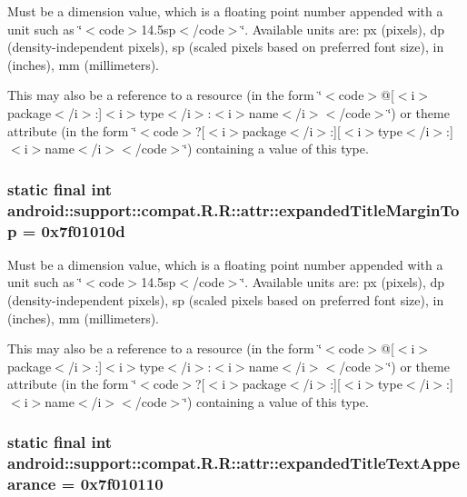 Must be a dimension value, which is a floating point number appended with a unit such as \char`\"{}$<$code$>$14.5sp$<$/code$>$\char`\"{}. Available units are: px (pixels), dp (density-independent pixels), sp (scaled pixels based on preferred font size), in (inches), mm (millimeters). 

This may also be a reference to a resource (in the form \char`\"{}$<$code$>$@\mbox{[}$<$i$>$package$<$/i$>$:\mbox{]}$<$i$>$type$<$/i$>$:$<$i$>$name$<$/i$>$$<$/code$>$\char`\"{}) or theme attribute (in the form \char`\"{}$<$code$>$?\mbox{[}$<$i$>$package$<$/i$>$:\mbox{]}\mbox{[}$<$i$>$type$<$/i$>$:\mbox{]}$<$i$>$name$<$/i$>$$<$/code$>$\char`\"{}) containing a value of this type. \hypertarget{classandroid_1_1support_1_1compat_1_1_r_1_1attr_1d98d1bed92ccab125168dd5e73a9acc}{
\subsubsection[{expandedTitleMarginTop}]{\setlength{\rightskip}{0pt plus 5cm}static final int android::support::compat.R.R::attr::expandedTitleMarginTop = 0x7f01010d}}
\label{classandroid_1_1support_1_1compat_1_1_r_1_1attr_1d98d1bed92ccab125168dd5e73a9acc}


Must be a dimension value, which is a floating point number appended with a unit such as \char`\"{}$<$code$>$14.5sp$<$/code$>$\char`\"{}. Available units are: px (pixels), dp (density-independent pixels), sp (scaled pixels based on preferred font size), in (inches), mm (millimeters). 

This may also be a reference to a resource (in the form \char`\"{}$<$code$>$@\mbox{[}$<$i$>$package$<$/i$>$:\mbox{]}$<$i$>$type$<$/i$>$:$<$i$>$name$<$/i$>$$<$/code$>$\char`\"{}) or theme attribute (in the form \char`\"{}$<$code$>$?\mbox{[}$<$i$>$package$<$/i$>$:\mbox{]}\mbox{[}$<$i$>$type$<$/i$>$:\mbox{]}$<$i$>$name$<$/i$>$$<$/code$>$\char`\"{}) containing a value of this type. \hypertarget{classandroid_1_1support_1_1compat_1_1_r_1_1attr_653e54aaf651ee4567e45056d22ad1ec}{
\subsubsection[{expandedTitleTextAppearance}]{\setlength{\rightskip}{0pt plus 5cm}static final int android::support::compat.R.R::attr::expandedTitleTextAppearance = 0x7f010110}}
\label{classandroid_1_1support_1_1compat_1_1_r_1_1attr_653e54aaf651ee4567e45056d22ad1ec}



